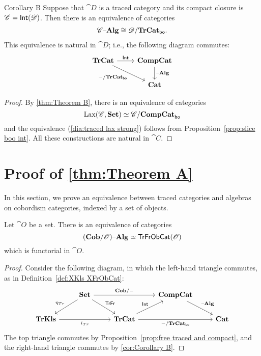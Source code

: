 \documentclass[12pt,oneside,article,draft]{memoir}
\begin{document}
 \begin{named}{Corollary B}
Suppose that $\cat{D}$ is a traced category and its compact closure is $\mathscr{C}=\mathsf{Int}(\mathscr{D})$. Then there is an equivalence of categories
\begin{align}\label{dia:traced lax strong}
\mathscr{C}{\text \textendash}\mathbf{Alg}\cong\mathscr{D}/\mathbf{TrCat}_{\mathsf{bo}}.
\end{align}
This equivalence is natural in $\cat{D}$; i.e., the following diagram commutes:
\begin{equation*}
\begin{tikzcd}
\TrCat\ar[r,"\Fun{Int}"]\ar[dr,"-/\TrCat_{\bo}"']&\CompCat\ar[d,"\alg"]\\
&\Cat{Cat}
\end{tikzcd}
\end{equation*}
\end{named}

\begin{proof}

By \ref{thm:Theorem B}, there is an equivalence of categories 
$$\operatorname{Lax}(\mathscr{C},\mathbf{Set})\simeq\mathscr{C}/\mathbf{CompCat}_{\mathsf{bo}}$$
and the equivalence (\ref{dia:traced lax strong}) follows from Proposition~\ref{prop:slice boo int}. All these constructions are natural in $\cat{C}$. 

\end{proof}

\section{Proof of \ref{thm:Theorem A}}\label{sec:proof of A}

In this section, we prove an equivalence between traced categories and algebras on cobordism categories, indexed by a set of objects. 

\begin{proposition}\label{prop:natural equivalence cob-O and traced-O}

Let $\cat{O}$ be a set. There is an equivalence of categories 
$$(\mathbf{Cob}/\mathscr{O}){\text \textendash}\mathbf{Alg}\simeq\mathsf{TrFrObCat}(\mathscr{O})$$
which is functorial in $\cat{O}$.

\end{proposition}

\begin{proof}

Consider the following diagram, in which the left-hand triangle commutes, as in Definition~\ref{def:XKls XFrObCat}:
$$
\begin{tikzcd}
&\Set\ar[rr,"\Cat{Cob/-}"]\ar[dl,"\eta_{Tr}"']\ar[dr,"\Fun{TrFr}"]&&\Cat{CompCat}\ar[dr,"\alg"]\\
\Cat{TrKls}\ar[rr,"i_{Tr}"']&&\Cat{TrCat}\ar[ur,"\Fun{Int}"]\ar[rr,"-/\TrCat_{\bo}"']&&\Cat{Cat}
\end{tikzcd}
$$
The top triangle commutes by Proposition~\ref{prop:free traced and compact}, and the right-hand triangle commutes by \ref{cor:Corollary B}.

\end{proof}
\end{document}
